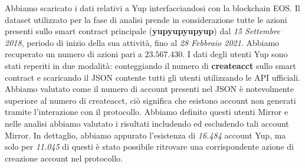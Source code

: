 Abbiamo scaricato i dati relativi a Yup interfacciandosi con la blockchain EOS. Il dataset utilizzato per la fase di analisi prende in considerazione tutte le azioni presenti sullo smart contract principale (\textbf{yupyupyupyup}) dal \textit{15 Settembre 2018}, periodo di inizio della sua attività, fino al \textit{28 Febbraio 2021}. Abbiamo recuperato un numero di azioni pari a $23.567.430$. 
I dati degli utenti Yup sono stati reperiti in due modalità: conteggiando il numero di \textbf{createacct} sullo smart contract e scaricando il JSON contente tutti gli utenti utilizzando le API ufficiali. Abbiamo valutato come il numero di account presenti nel JSON è notevolmente superiore al numero di createacct, ciò significa che esistono account non generati tramite l'interazione con il protocollo. Abbiamo definito questi utenti Mirror e nelle analisi abbiamo valutato i risultati includendo ed escludendo tali account Mirror. In dettaglio, abbiamo appurato l'esistenza di \textit{16.484} account Yup, ma solo per \textit{11.045} di questi è stato possibile ritrovare una corrispondente azione di creazione account nel protocollo.






